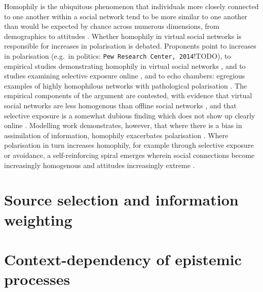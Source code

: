 \documentclass[a4paper, nobind]{templates/ociamthesis}
\begin{document}
Homophily is the ubiquitous phenomenon that individuals more closely connected to one another within a social network tend to be more similar to one another than would be expected by chance across numerous dimensions, from demographics to attitudes \autocite{mcphersonBirdsFeatherHomophily2001}. Whether homophily in virtual social networks is responsible for increases in polarisation is debated. Proponents point to increases in polarisation (e.g.~in politics: \texttt{Pew\ Research\ Center,\ 2014}!TODO), to empirical studies demonstrating homophily in virtual social networks \autocite{cardosoTopicalHomophilyOnline2017,colleoniEchoChamberPublic2014}, and to studies examining selective exposure online \autocite{kobayashiSELECTIVEEXPOSUREPOLITICAL2009}, and to echo chambers: egregious examples of highly homophilous networks with pathological polarisation \autocite{sunsteinRepublicCom2002,sunsteinRepublicDividedDemocracy2018}. The empirical components of the argument are contested, with evidence that virtual social networks are less homogenous than offline social networks \autocite[and hence depolarising,][]{barberaHowSocialMedia2015}, and that selective exposure is a somewhat dubious finding which does not show up clearly online \autocite{garrettEchoChambersOnline2009,garrettPoliticallyMotivatedReinforcement2009,nelsonMythPartisanSelective2017,searsSelectiveExposureInformation1967}. Modelling work demonstrates, however, that where there is a bias in assimilation of information, homophily exacerbates polarisation \autocite{dandekarBiasedAssimilationHomophily2013}. Where polarisation in turn increases homophily, for example through selective exposure or avoidance, a self-reinforcing spiral emerges wherein social connections become increasingly homogenous and attitudes increasingly extreme \autocite{songDynamicSpiralsPut2017}.

\hypertarget{source-selection-and-information-weighting}{%
\section*{Source selection and information weighting}\label{source-selection-and-information-weighting}}

\hypertarget{context-dependency-of-epistemic-processes}{%
\section*{Context-dependency of epistemic processes}\label{context-dependency-of-epistemic-processes}}
\end{document}
